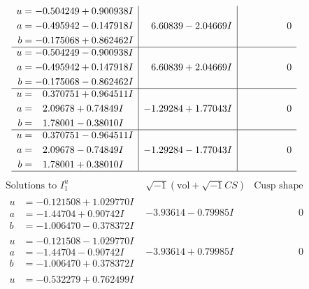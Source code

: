 \documentclass[1p]{elsarticle_modified}
\theoremstyle{definition}
\newcommand{\I}{\sqrt{-1}}
\begin{document}
$$\begin{array}{c|c|c}
\begin{aligned}
u &= -0.504249 + 0.900938 I \\
a &= -0.495942 - 0.147918 I \\
b &= -0.175068 + 0.862462 I\end{aligned}
 & \phantom{-}6.60839 - 2.04669 I & \phantom{-0.000000 } 0 \\ \hline\begin{aligned}
u &= -0.504249 - 0.900938 I \\
a &= -0.495942 + 0.147918 I \\
b &= -0.175068 - 0.862462 I\end{aligned}
 & \phantom{-}6.60839 + 2.04669 I & \phantom{-0.000000 } 0 \\ \hline\begin{aligned}
u &= \phantom{-}0.370751 + 0.964511 I \\
a &= \phantom{-}2.09678 + 0.74849 I \\
b &= \phantom{-}1.78001 - 0.38010 I\end{aligned}
 & -1.29284 + 1.77043 I & \phantom{-0.000000 } 0 \\ \hline\begin{aligned}
u &= \phantom{-}0.370751 - 0.964511 I \\
a &= \phantom{-}2.09678 - 0.74849 I \\
b &= \phantom{-}1.78001 + 0.38010 I\end{aligned}
 & -1.29284 - 1.77043 I & \phantom{-0.000000 } 0\\
 \hline 
 \end{array}$$\newpage$$\begin{array}{c|c|c}  
\text{Solutions to }I^u_{1}& \I (\text{vol} + \sqrt{-1}CS) & \text{Cusp shape}\\
 \hline 
\begin{aligned}
u &= -0.121508 + 1.029770 I \\
a &= -1.44704 + 0.90742 I \\
b &= -1.006470 - 0.378372 I\end{aligned}
 & -3.93614 - 0.79985 I & \phantom{-0.000000 } 0 \\ \hline\begin{aligned}
u &= -0.121508 - 1.029770 I \\
a &= -1.44704 - 0.90742 I \\
b &= -1.006470 + 0.378372 I\end{aligned}
 & -3.93614 + 0.79985 I & \phantom{-0.000000 } 0 \\ \hline\begin{aligned}
u &= -0.532279 + 0.762499 I \\

\end{aligned}
\end{array}$$
\end{document}
